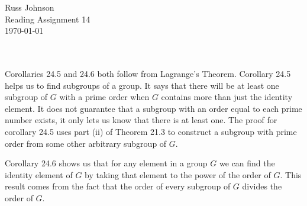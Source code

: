 \documentclass[11pt,a4paper]{article}
\begin{document}
\begin{flushright}
Russ Johnson\\
Reading Assignment 14\\
\today\\
\end{flushright}
~\\
~\\
Corollaries 24.5 and 24.6 both follow from Lagrange's Theorem. Corollary 24.5 helps us to find subgroups of a group. It says that there will be at least one subgroup of $G$ with a prime order when $G$ contains more than just the identity element. It does not guarantee that a subgroup with an order equal to each prime number exists, it only lets us know that there is at least one. The proof for corollary 24.5 uses part (ii) of Theorem 21.3 to construct a subgroup with prime order from some other arbitrary subgroup of $G$.

Corollary 24.6 shows us that for any element in a group $G$ we can find the identity element of $G$ by taking that element to the power of the order of $G$. This result comes from the fact that the order of every subgroup of $G$ divides the order of $G$.
\end{document}
